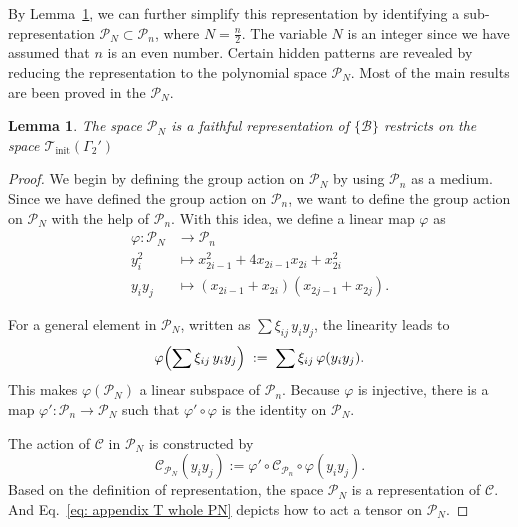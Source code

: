 \documentclass[showpacs,onecolumn,aps,prx,long bibliography,superscriptaddress,notitlepage]{revtex4-1}
\newtheorem{lemma}{Lemma}
\newcommand{\Tcal}{\mathcal{T}}
\begin{document}
By Lemma~\ref{lemma: reduce Pn to PN}, we can further simplify this representation by identifying a sub-representation \(\mathcal{P}_N \subset \mathcal{P}_n\), where \(N = \tfrac{n}{2}\). The variable \(N\) is an integer since we have assumed that $n$ is an even number. Certain hidden patterns are revealed by reducing the representation to the polynomial space $\mathcal{P}_N$. Most of the main results are been proved in the $\mathcal{P}_N$. 


\begin{lemma}
    \label{lemma: reduce Pn to PN}
    The space $\mathcal{P}_N$ is a faithful representation of $\{\mathcal{B}\}$ restricts on the space $\Tcal_\text{init}(\Gamma_2')$
\end{lemma}
\begin{proof}
We begin by defining the group action on \(\mathcal{P}_N\) by using \(\mathcal{P}_n\) as a medium. Since we have defined the group action on \(\mathcal{P}_n\), we want to define the group action on \(\mathcal{P}_N\) with the help of \(\mathcal{P}_n\). With this idea, we define a linear map $\varphi$ as
\begin{equation}
    \begin{aligned}
        \varphi : \mathcal{P}_N &\to \mathcal{P}_n \\
          y_i^2 &\mapsto x_{2i-1}^2+4 x_{2i-1} x_{2i}+x_{2i}^2\\
       y_i y_j &\mapsto  \left(x_{2i-1}+x_{2i}\right)\left(x_{2j-1}+x_{2j}\right).
    \end{aligned}
\end{equation}
    
For a general element in \(\mathcal{P}_N\), written as \(\sum \xi_{ij}\,y_i y_j\), the linearity leads to
\[
\varphi\Bigl(\sum \xi_{ij}\,y_i y_j\Bigr)
\;:=\;
\sum \xi_{ij}\,\varphi(y_i y_j).
\]
    This makes \(\varphi(\mathcal{P}_N)\) a linear subspace of \(\mathcal{P}_n\). Because \(\varphi\) is injective, there is a map \(\varphi': \mathcal{P}_n \to \mathcal{P}_N\) such that \(\varphi' \circ \varphi\) is the identity on \(\mathcal{P}_N\).  
    
    The action of $\mathcal{C}$ in $\mathcal{P}_N$ is constructed by 
    \begin{equation}
        \mathcal{C}_{\mathcal{P}_N}(y_i y_j) := \varphi' \circ \mathcal{C}_{\mathcal{P}_n}\circ \varphi(y_i y_j).
        \label{eq: appendix T whole PN}
    \end{equation}
    Based on the definition of representation, the space $\mathcal{P}_N$ is a representation of $\mathcal{C}$. And Eq.~\eqref{eq: appendix T whole PN} depicts how to act a tensor on $\mathcal{P}_N$.
    

\end{proof}
\end{document}
